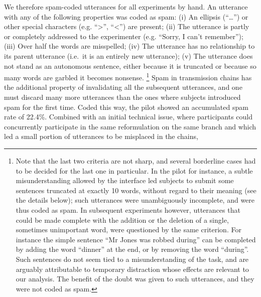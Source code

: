 \documentclass[a4paper,fleqn]{cas-dc}
\begin{document}
We therefore spam-coded utterances for all experiments by hand. An utterance
with any of the following properties was coded as spam:
(i)
  An ellipsis (\enquote{\ldots{}}) or other special characters (e.g.
  \enquote{\textgreater{}}, \enquote{\textless{}}) are present;
(ii)
  The utterance is partly or completely addressed to the experimenter
  (e.g. \enquote{Sorry, I can't remember});
(iii)
  Over half the words are misspelled;
(iv)
  The utterance has no relationship to its parent utterance (i.e.~it is
  an entirely new utterance);
(v)
  The utterance does not stand as an autonomous sentence, either because
  it is truncated or because so many words are garbled it becomes
  nonsense.
\footnote{Note that the last two criteria are not sharp, and several borderline
cases had to be decided for the last one in particular. In the pilot
for instance, a subtle misunderstanding allowed by the interface led
subjects to submit some sentences truncated at exactly 10 words, without
regard to their meaning (see the details below); such utterances were
unambiguously incomplete, and were thus coded as spam. In subsequent
experiments however, utterances that could be made complete with the
addition or the deletion of a single, sometimes unimportant word, were
questioned by the same criterion. For instance the simple sentence
\enquote{Mr Jones was robbed during} can be completed by adding the word
\enquote{dinner} at the end, or by removing the word \enquote{during}.
Such sentences do not seem tied to a misunderstanding of the task, and
are arguably attributable to temporary distraction whose effects are
relevant to our analysis. The benefit of the doubt was given to such
utterances, and they were not coded as spam.}
Spam in transmission chains has the additional property of invalidating
all the subsequent utterances, and one must discard many more utterances than the ones where subjects introduced spam for the first time.
Coded this way, the pilot showed an accumulated spam rate of 22.4\%.
Combined with an initial technical issue, where participants could concurrently participate in the same reformulation on the same branch and which led a small portion of
utterances to be misplaced in the chains,
\end{document}
